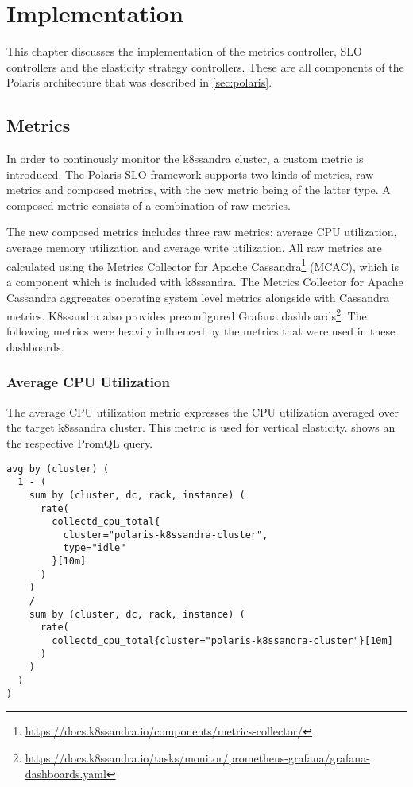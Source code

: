 \chapter{Implementation}
\label{ch:implementation}

This chapter discusses the implementation of the metrics controller, SLO controllers and the elasticity strategy controllers. These are all components of the Polaris architecture that was described in \cref{sec:polaris}.
\section{Metrics}
\label{sec:metrics}

In order to continously monitor the k8ssandra cluster, a custom metric is introduced. The Polaris SLO framework supports two kinds of metrics, raw metrics and composed metrics, with the new metric being of the latter type. A composed metric consists of a combination of raw metrics.

The new composed metrics includes three raw metrics: average CPU utilization, average memory utilization and average write utilization. All raw metrics are calculated using the Metrics Collector for Apache Cassandra\footnote{\url{https://docs.k8ssandra.io/components/metrics-collector/}} (MCAC), which is a component which is included with k8ssandra. The Metrics Collector for Apache Cassandra aggregates operating system level metrics alongside with Cassandra metrics. K8ssandra also provides preconfigured Grafana dashboards\footnote{\raggedright\url{https://docs.k8ssandra.io/tasks/monitor/prometheus-grafana/grafana-dashboards.yaml}}. The following metrics were heavily influenced by the metrics that were used in these dashboards.

\subsection{Average CPU Utilization}

The average CPU utilization metric expresses the CPU utilization averaged over the target k8ssandra cluster. This metric is used for vertical elasticity.  shows an the respective PromQL query.

\begin{lstlisting}[caption={PromQL query used for the average CPU utilisation metric},
                    captionpos=b,
                    label=lst:avgCpuUtilization,
                    float]
avg by (cluster) (
  1 - (
    sum by (cluster, dc, rack, instance) (
      rate(
        collectd_cpu_total{
          cluster="polaris-k8ssandra-cluster",
          type="idle"
        }[10m]
      )
    )
    /
    sum by (cluster, dc, rack, instance) (
      rate(
        collectd_cpu_total{cluster="polaris-k8ssandra-cluster"}[10m]
      )
    )
  )
)
\end{lstlisting}

